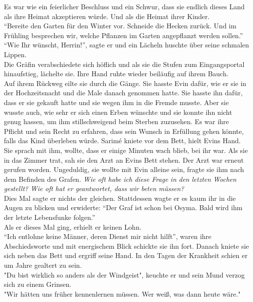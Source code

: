 Es war wie ein feierlicher Beschluss und ein Schwur, dass sie endlich dieses Land als ihre Heimat 
akzeptieren würde. Und als die Heimat ihrer Kinder.\\
``Bereite den Garten für den Winter vor. Schneide die Hecken zurück. Und im Frühling besprechen 
wir, 
welche Pflanzen im Garten angepflanzt werden sollen.''\\
``Wie Ihr wünscht, Herrin!'', sagte er und ein Lächeln huschte über seine schmalen Lippen.\\
Die Gräfin verabschiedete sich höflich und als sie die Stufen zum Eingangsportal hinaufstieg, 
lächelte sie. Ihre Hand ruhte wieder beiläufig auf ihrem Bauch. \\

Auf ihrem Rückweg eilte sie durch die Gänge. Sie hasste Evin dafür, wie er sie in der 
Hochzeitsnacht und die Male danach genommen hatte. Sie hasste ihn dafür, dass er sie gekauft hatte 
und sie wegen ihm in die Fremde musste. Aber sie wusste auch, wie sehr er sich einen Erben wünschte 
und sie konnte ihn nicht genug hassen, um ihm stillschweigend beim Sterben zuzusehen. Es war ihre 
Pflicht und sein Recht zu erfahren, dass sein Wunsch in Erfüllung gehen könnte, falls das Kind 
überleben würde. Sarimé kniete vor dem Bett, hielt Evins Hand. Sie sprach mit ihm, wollte, dass er 
einige Minuten wach blieb, bei ihr war. Als sie in das Zimmer trat, sah sie den Arzt an Evins Bett 
stehen. Der Arzt war erneut gerufen worden. Ungeduldig, sie wollte mit Evin alleine sein, fragte 
sie ihm nach dem Befinden des Grafen. \textit{Wie oft habe ich diese Frage in den letzten Wochen 
gestellt? Wie oft hat er geantwortet, dass wir beten müssen?}\\
Dies Mal sagte er nichts der gleichen. Stattdessen wagte er es kaum ihr in die Augen zu blicken und 
erwiderte: ``Der Graf ist schon bei Osyma. Bald wird ihm der letzte Lebensfunke folgen.''\\
Als er dieses Mal ging, erhielt er keinen Lohn.\\
``Ich entlohne keine Männer, deren Dienst mir nicht hilft'', waren ihre Abschiedsworte und mit 
energischem Blick schickte sie ihn fort. Danach kniete sie sich neben das Bett und ergriff seine 
Hand. In den Tagen der Krankheit schien er um Jahre gealtert zu sein. \\
"Du bist wirklich so anders als der Windgeist", keuchte er und sein Mund verzog sich zu einem 
Grinsen.\\
"Wir hätten uns früher kennenlernen müssen. Wer weiß, was dann heute wäre."\\
